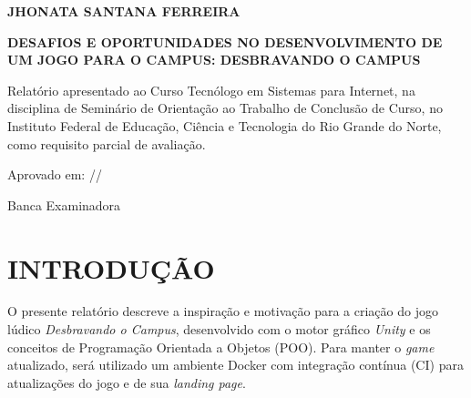 \documentclass[12pt, a4paper]{article}
\begin{document}
\begin{titlepage}
    \begin{center}
        {\normalsize\bfseries JHONATA SANTANA FERREIRA}

        \vspace{1.5cm}

        {\normalsize\bfseries DESAFIOS E OPORTUNIDADES NO DESENVOLVIMENTO DE UM JOGO PARA O CAMPUS: DESBRAVANDO O CAMPUS}
    \end{center}

    \vspace{1cm}

    \begin{flushright}
        \begin{minipage}{0.5\textwidth}
            \normalsize
            \setlength{\parindent}{0pt}
            Relatório apresentado ao Curso Tecnólogo em Sistemas para Internet, na disciplina de Seminário de Orientação ao Trabalho de Conclusão de Curso, no Instituto Federal de Educação, Ciência e Tecnologia do Rio Grande do Norte, como requisito parcial de avaliação.
        \end{minipage}
    \end{flushright}

    \vspace{1cm}

    \noindent Aprovado em: \underline{\hspace{0.8cm}}/\underline{\hspace{0.8cm}}/\underline{\hspace{1.2cm}}

    \vspace{0.8cm}
    \begin{center}
        Banca Examinadora
    \end{center}

\end{titlepage}

\newpage

\tableofcontents
\newpage

\section{INTRODUÇÃO}

O presente relatório descreve a inspiração e motivação para a criação do jogo
lúdico \textit{Desbravando o Campus}, desenvolvido com o motor gráfico
\textit{Unity} e os conceitos de Programação Orientada a Objetos (POO).
Para manter o \textit{game} atualizado, será utilizado um ambiente Docker
com integração contínua (CI) para atualizações do jogo e de sua \textit{landing page}.
\end{document}
